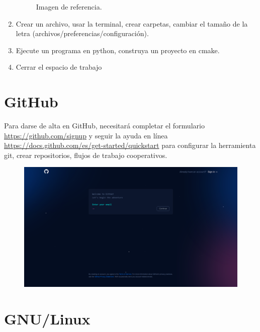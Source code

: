 \begin{enumerate}
\begin{figure}[ht!]
		      \caption{Imagen de referencia.}
	      \end{figure}
	\item Crear un archivo, usar la terminal, crear carpetas, cambiar el tamaño de la letra (archivos/preferencias/configuración).
	\item Ejecute un programa en python, construya un proyecto en cmake.
	\item Cerrar el espacio de trabajo
\end{enumerate}


\section{GitHub}

Para darse de alta en GitHub, necesitará completar el formulario \url{https://github.com/signup} y seguir la ayuda en línea \url{https://docs.github.com/es/get-started/quickstart} para configurar la herramienta git, crear repositorios, flujos de trabajo cooperativos.

\begin{figure}[ht!]
	\centering
	\includegraphics[width=.6\paperwidth]{images/signup}
\end{figure}


\section{GNU/Linux}

